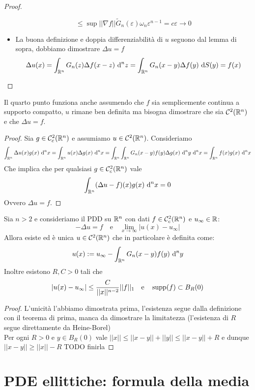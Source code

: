 \documentclass{article}
\begin{document}
\begin{proof}
\begin{itemize}
        \[\le \sup||\nabla f|| \tilde{G}_n(\varepsilon) \omega_n \varepsilon^{n-1} = c\varepsilon \to 0\]
        \item La buona definizione e doppia differenziabilità di $u$ seguono dal lemma di sopra, dobbiamo dimostrare $\Delta u = f$
        \[\Delta u(x) = \int_{\mathbb{R}^n} G_n(z) \Delta f(x-z)\text{ d}^n z = \int_{\mathbb{R}^n} G_n(x-y)\Delta f(y)\text{ d} S(y) = f(x)\]
    \end{itemize}
\end{proof}

\begin{remark}{}{}
    Il quarto punto funziona anche assumendo che $f$ sia semplicemente continua a supporto compatto, $u$ rimane ben definita ma bisogna dimostrare che sia $\mathcal{C}^2(\mathbb{R}^n)$ e che $\Delta u = f$.
\end{remark}
\begin{proof}
    Sia $g \in \mathcal{C}^2_c(\mathbb{R}^n)$ e assumiamo $u \in \mathcal{C}^2(\mathbb{R}^n)$. Consideriamo
    \[\int_{\mathbb{R}^n}\Delta u (x) g(x) \text{ d}^n x = \int_{\mathbb{R}^n}u(x)\Delta g(x)\text{ d}^n x = \int_{\mathbb{R}^n}\int_{\mathbb{R}^n}G_n(x-y)f(y)\Delta g(x)\text{ d}^n y\text{ d}^n x = \int_{\mathbb{R}^n} f(x)g(x)\text{ d}^n x\]
    Che implica che per qualsiasi $g \in \mathcal{C}^2_c(\mathbb{R}^n)$ vale
    \[\int_{\mathbb{R}^n}(\Delta u - f)(x)g(x)\text{ d}^n x = 0\]
    Ovvero $\Delta u = f$.
\end{proof}

\begin{theorem}{}{}
    Sia $n>2$ e consideriamo il PDD su $\mathbb{R}^n$ con dati $f \in \mathcal{C}^2_c(\mathbb{R}^n)$ e $u_\infty\in\mathbb{R}$:
    \[-\Delta u = f \quad \text{e}\quad \lim_{x\to\infty}|u(x)-u_\infty|\]
    Allora esiste ed è unica $u \in \mathcal{C}^2(\mathbb{R}^n)$ che in particolare è definita come:
    \[u(x):= u_\infty - \int_{\mathbb{R}^n} G_n(x-y)f(y)\text{ d}^n y\]
    Inoltre esistono $R,C>0$ tali che 
    \[|u(x) - u_\infty| \le \frac{C}{||x||^{n-2}}||f||_1 \quad \text{e}\quad \operatorname{supp}(f) \subset B_R(0)\]
\end{theorem}
\begin{proof}
    L'unicità l'abbiamo dimostrata prima, l'esistenza segue dalla definizione con il teorema di prima, manca da dimostrare la limitatezza (l'esistenza di $R$ segue direttamente da Heine-Borel)\\
    Per ogni $R>0$ e $y \in B_R(0)$ vale $||x||\le ||x-y||+||y||\le ||x-y||+R$ e dunque $||x-y||\ge ||x|| - R$
    TODO finirla
\end{proof}

\section{PDE ellittiche: formula della media}
\end{document}

